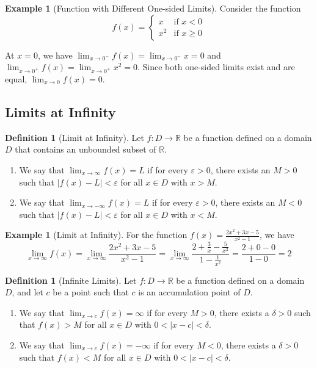 \documentclass[12pt,a4paper]{article}
\theoremstyle{plain}
\theoremstyle{definition}
\newtheorem{definition}[theorem]{Definition}
\newtheorem{example}[theorem]{Example}
\begin{document}
\begin{example}[Function with Different One-sided Limits]
Consider the function
\begin{equation}
f(x) = \begin{cases}
x & \text{if } x < 0 \\
x^2 & \text{if } x \geq 0
\end{cases}
\end{equation}

At $x = 0$, we have $\lim_{x \to 0^-} f(x) = \lim_{x \to 0^-} x = 0$ and $\lim_{x \to 0^+} f(x) = \lim_{x \to 0^+} x^2 = 0$. Since both one-sided limits exist and are equal, $\lim_{x \to 0} f(x) = 0$.
\end{example}

\subsection{Limits at Infinity}

\begin{definition}[Limit at Infinity]
Let $f: D \to \mathbb{R}$ be a function defined on a domain $D$ that contains an unbounded subset of $\mathbb{R}$.
\begin{enumerate}[label=(\roman*)]
\item We say that $\lim_{x \to \infty} f(x) = L$ if for every $\varepsilon > 0$, there exists an $M > 0$ such that $|f(x) - L| < \varepsilon$ for all $x \in D$ with $x > M$.
\item We say that $\lim_{x \to -\infty} f(x) = L$ if for every $\varepsilon > 0$, there exists an $M < 0$ such that $|f(x) - L| < \varepsilon$ for all $x \in D$ with $x < M$.
\end{enumerate}
\end{definition}

\begin{example}[Limit at Infinity]
For the function $f(x) = \frac{2x^2 + 3x - 5}{x^2 - 1}$, we have
\begin{equation}
\lim_{x \to \infty} f(x) = \lim_{x \to \infty} \frac{2x^2 + 3x - 5}{x^2 - 1} = \lim_{x \to \infty} \frac{2 + \frac{3}{x} - \frac{5}{x^2}}{1 - \frac{1}{x^2}} = \frac{2 + 0 - 0}{1 - 0} = 2
\end{equation}
\end{example}

\begin{definition}[Infinite Limits]
Let $f: D \to \mathbb{R}$ be a function defined on a domain $D$, and let $c$ be a point such that $c$ is an accumulation point of $D$.
\begin{enumerate}[label=(\roman*)]
\item We say that $\lim_{x \to c} f(x) = \infty$ if for every $M > 0$, there exists a $\delta > 0$ such that $f(x) > M$ for all $x \in D$ with $0 < |x - c| < \delta$.
\item We say that $\lim_{x \to c} f(x) = -\infty$ if for every $M < 0$, there exists a $\delta > 0$ such that $f(x) < M$ for all $x \in D$ with $0 < |x - c| < \delta$.
\end{enumerate}
\end{definition}
\end{document}
